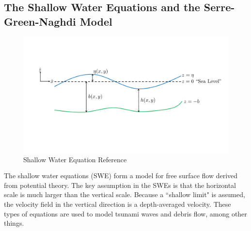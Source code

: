 \subsection{The Shallow Water Equations and the Serre-Green-Naghdi Model}

\begin{figure}
    \centering
    \includegraphics[width=\columnwidth]{../figures/swe_model.pdf}
    \caption{Shallow Water Equation Reference}
    \label{fig:swe}
\end{figure}

The shallow water equations (SWE) form a model for free surface flow derived from potential theory. The key assumption in the SWEs is that the horizontal scale is much larger than the vertical scale. Because a ``shallow limit" is assumed, the velocity field in the vertical direction is a depth-averaged velocity. These types of equations are used to model tsunami waves and debris flow, among other things.

